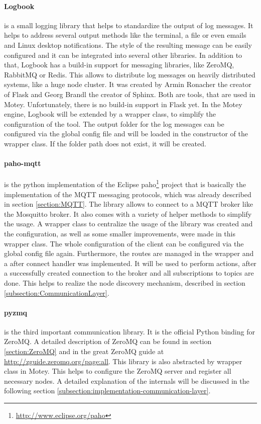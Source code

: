 \paragraph{Logbook} is a small logging library that helps to standardize the output of log messages.
It helps to address several output methods like the terminal, a file or even emails and Linux desktop notifications.
The style of the resulting message can be easily configured and it can be integrated into several other libraries.
In addition to that, Logbook has a build-in support for messaging libraries, like ZeroMQ, RabbitMQ or Redis.
This allows to distribute log messages on heavily distributed systems, like a huge node cluster.
It was created by Armin Ronacher the creator of Flask and Georg Brandl the creator of Sphinx.
Both are tools, that are used in Motey.
Unfortunately, there is no build-in support in Flask yet.
In the Motey engine, Logbook will be extended by a wrapper class, to simplify the configuration of the tool.
The output folder for the log messages can be configured via the global config file and will be loaded in the constructor of the wrapper class.
If the folder path does not exist, it will be created.

\paragraph{paho-mqtt} is the python implementation of the Eclipse paho\footnote{\url{http://www.eclipse.org/paho}} project that is basically the implementation of the \ac{MQTT} messaging protocols, which was already described in section \ref{section:MQTT}.
The library allows to connect to a \ac{MQTT} broker like the Mosquitto broker.
It also comes with a variety of helper methods to simplify the usage.
A wrapper class to centralize the usage of the library was created and the configuration, as well as some smaller improvements, were made in this wrapper class.
The whole configuration of the client can be configured via the global config file again.
Furthermore, the routes are managed in the wrapper and a after connect handler was implemented.
It will be used to perform actions, after a successfully created connection to the broker and all subscriptions to topics are done.
This helps to realize the node discovery mechanism, described in section \ref{subsection:CommunicationLayer}.

\paragraph{pyzmq} is the third important communication library.
It is the official Python binding for ZeroMQ.
A detailed description of ZeroMQ can be found in section \ref{section:ZeroMQ} and in the great ZeroMQ guide at \url{http://zguide.zeromq.org/page:all}.
This library is also abstracted by wrapper class in Motey.
This helps to configure the ZeroMQ server and register all necessary nodes.
A detailed explanation of the internals will be discussed in the following section \ref{subsection:implementation-communication-layer}.

